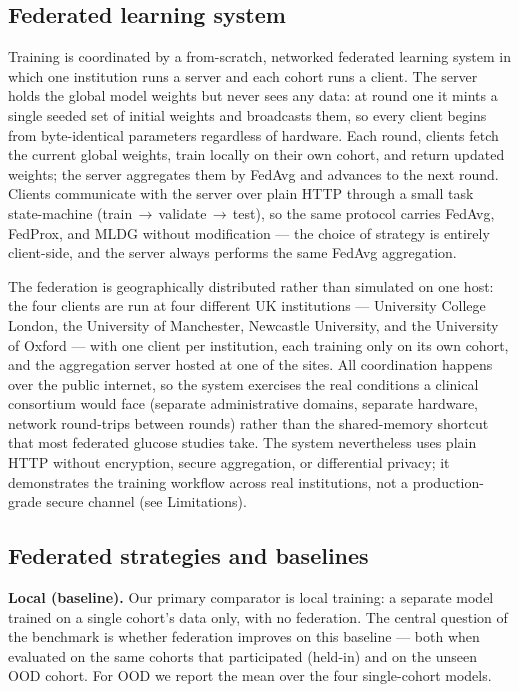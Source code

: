 \documentclass[10pt,letterpaper]{article}
\begin{document}
\subsection*{Federated learning system}

Training is coordinated by a from-scratch, networked federated learning system
in which one institution runs a server and each cohort runs a client. The server
holds the global model weights but never sees any data: at round one it mints a
single seeded set of initial weights and broadcasts them, so every client begins
from byte-identical parameters regardless of hardware. Each round, clients fetch
the current global weights, train locally on their own cohort, and return updated
weights; the server aggregates them by FedAvg and advances to the next round.
Clients communicate with the server over plain HTTP through a small task
state-machine (train\,$\rightarrow$\,validate\,$\rightarrow$\,test), so the same
protocol carries FedAvg, FedProx, and MLDG without modification --- the choice of
strategy is entirely client-side, and the server always performs the same FedAvg
aggregation.

The federation is geographically distributed rather than simulated on one host:
the four clients are run at four different UK institutions --- University College
London, the University of Manchester, Newcastle University, and the University of
Oxford --- with one client per institution, each training only on its own cohort,
and the aggregation server hosted at one of the sites. All coordination happens
over the public internet, so the system exercises the real conditions a clinical
consortium would face (separate administrative domains, separate hardware,
network round-trips between rounds) rather than the shared-memory shortcut that
most federated glucose studies take. The system nevertheless uses plain HTTP
without encryption, secure aggregation, or differential privacy; it demonstrates
the training workflow across real institutions, not a production-grade secure
channel (see Limitations).

\subsection*{Federated strategies and baselines}

\textbf{Local (baseline).} Our primary comparator is local training: a separate
model trained on a single cohort's data only, with no federation. The central
question of the benchmark is whether federation improves on this baseline ---
both when evaluated on the same cohorts that participated (held-in) and on the
unseen OOD cohort. For OOD we report the mean over the four single-cohort models.
\end{document}
